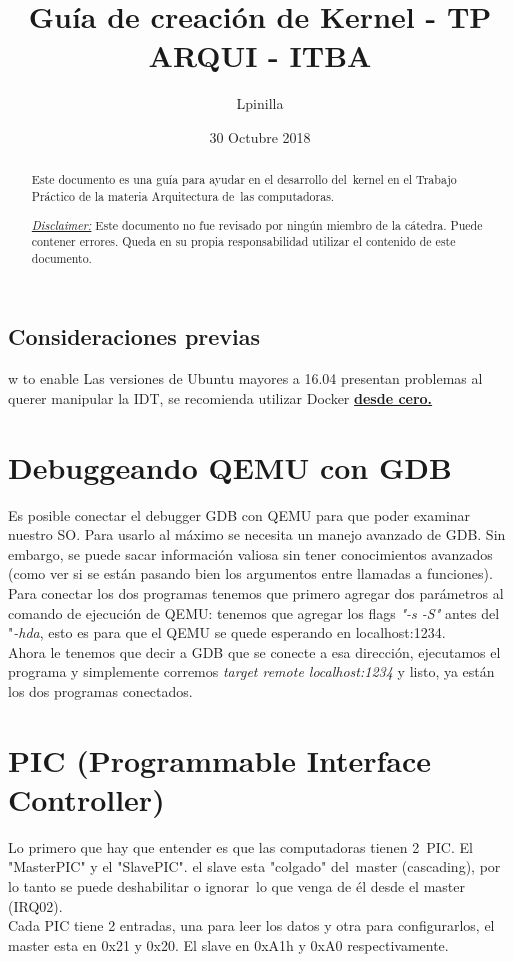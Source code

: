 \documentclass[]{article}
\title{Gu\'ia de creaci\'on de Kernel - TP ARQUI - ITBA}
\author{Lpinilla}
\date{30 Octubre 2018}
\begin{document}
\maketitle

\begin{abstract}
	Este documento es una gu\'ia para ayudar en el desarrollo del\
	kernel en el Trabajo Práctico de la materia Arquitectura de\
	las computadoras. 
	
	\underline{\textit{Disclaimer:}} Este documento no fue revisado por ning\'un miembro de la c\'atedra. Puede contener errores. Queda en su propia responsabilidad utilizar el contenido de este documento.
\end{abstract}

\subsection*{Consideraciones previas}w to enable
Las versiones de Ubuntu mayores a 16.04 presentan problemas al querer manipular la IDT, se recomienda utilizar Docker \textbf{\underline{desde cero.}}

\section*{Debuggeando QEMU con GDB}
Es posible conectar el debugger GDB con QEMU para que poder examinar nuestro SO. Para usarlo al m\'aximo se necesita un manejo avanzado de GDB. Sin embargo, se puede sacar informaci\'on valiosa sin tener conocimientos avanzados (como ver si se est\'an pasando bien los argumentos entre llamadas a funciones).\\

Para conectar los dos programas tenemos que primero agregar dos parámetros al comando de ejecuci\'on de QEMU: tenemos que agregar los flags \textit{"-s -S"} antes del "\textit{-hda}, esto es para que el QEMU se quede esperando en localhost:1234.\\

Ahora le tenemos que decir a GDB que se conecte a esa direcci\'on, ejecutamos el programa y simplemente corremos \textit{target remote localhost:1234} y listo, ya est\'an los dos programas conectados.

\section*{PIC (Programmable Interface Controller)}
Lo primero que hay que entender es que las computadoras tienen 2\
PIC. El "MasterPIC" y el "SlavePIC". el slave esta "colgado" del\
master (cascading), por lo tanto se puede deshabilitar o ignorar\
lo que venga de él desde el master (IRQ02).\\
Cada PIC tiene 2 entradas, una para leer los datos y otra para configurarlos, el master esta en 0x21 y 0x20. El slave en 0xA1h y 0xA0
respectivamente.
\end{document}
